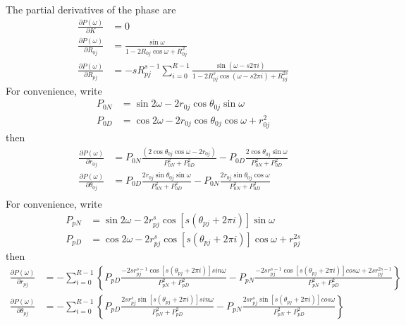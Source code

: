 \documentclass[a4paper,twoside,10pt,english]{report}
\begin{document}
\begin{raggedbottom}
The partial derivatives of the phase are
\begin{align*}
\frac{\partial P\left(\omega\right)}{\partial K} &= 0\\
\frac{\partial P\left(\omega\right)}{\partial R_{0j}} &= 
\frac{\sin\omega}{1-2R_{0j}\cos\omega+R_{0j}^{2}}\\
\frac{\partial P\left(\omega\right)}{\partial R_{pj}} &= 
-sR_{pj}^{s-1}\sum_{i=0}^{R-1}\frac{\sin\left(\omega-s2\pi i\right)}
{1-2R_{pj}^{s}\cos\left(\omega-s2\pi i\right)+R_{pj}^{2s}}
\end{align*}
For convenience, write
\begin{align*}
P_{0N}&=\sin2\omega-2r_{0j}\cos\theta_{0j}\sin\omega\\
P_{0D}&=\cos2\omega-2r_{0j}\cos\theta_{0j}\cos\omega+r_{0j}^{2}
\end{align*}
then
\begin{align*}
\frac{\partial P\left(\omega\right)}{\partial r_{0j}} &= 
P_{0N}\frac{\left(2\cos\theta_{0j}\cos\omega -2r_{0j}\right)}{P_{0N}^{2}+P_{0D}^{2}}
-P_{0D}\frac{2\cos\theta_{0j}\sin\omega}{P_{0N}^{2}+P_{0D}^{2}}\\
\frac{\partial P\left(\omega\right)}{\partial \theta_{0j}} &=
P_{0D}\frac{2r_{0j}\sin\theta_{0j}\sin\omega}{P_{0N}^{2}+P_{0D}^{2}}
-P_{0N}\frac{2r_{0j}\sin\theta_{0j}\cos\omega }{P_{0N}^{2}+P_{0D}^{2}}\\
\end{align*}
For convenience, write
\begin{align*}
P_{pN}&= \sin2\omega-
2r_{pj}^{s}\cos\left[s\left(\theta_{pj}+2\pi i\right)\right]\sin\omega\\
P_{pD}&=\cos2\omega-
2r_{pj}^{s}\cos\left[s\left(\theta_{pj}+2\pi i\right)\right]\cos\omega+r_{pj}^{2s}
\end{align*}
then
\begin{align*}
\frac{\partial P\left(\omega\right)}{\partial r_{pj}} &= -\sum_{i=0}^{R-1}\left\{
P_{pD}\frac{-2sr_{pj}^{s-1}\cos\left[s\left(\theta_{pj}+2\pi i\right)\right]
sin\omega}{P_{pN}^{2}+P_{pD}^{2}} -
P_{pN}\frac{-2sr_{pj}^{s-1}\cos\left[s\left(\theta_{pj}+2\pi i\right)\right]
cos\omega + 2sr_{pj}^{2s-1}}
{P_{pN}^{2}+P_{pD}^{2}}\right\}\\
\frac{\partial P\left(\omega\right)}{\partial \theta_{pj}} &= -\sum_{i=0}^{R-1}
\left\{
P_{pD}\frac{2sr_{pj}^{s}\sin\left[s\left(\theta_{pj}+2\pi i\right)\right]
sin\omega}{P_{pN}^{2}+P_{pD}^{2}}
-P_{pN}\frac{2sr_{pj}^{s}\sin\left[s\left(\theta_{pj}+2\pi i\right)\right]cos\omega}
{P_{pN}^{2}+P_{pD}^{2}} \right\}\\
\end{align*}


\end{raggedbottom}
\end{document}

